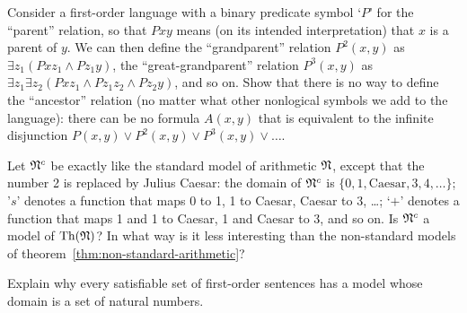 \begin{exercise}
  Consider a first-order language with a binary predicate symbol `$P$' for the ``parent'' relation,
  so that $Pxy$ means (on its intended interpretation) that $x$ is a parent of $y$.
  We can then define the ``grandparent'' relation $P^2(x,y)$ as $\exists z_1 (Pxz_1 \land Pz_1y)$,
  the ``great-grandparent'' relation $P^3(x,y)$ as $\exists z_1 \exists z_2 (Pxz_1 \land Pz_1z_2 \land Pz_2y)$,
  and so on.
  Show that there is no way to define the ``ancestor'' relation
  (no matter what other nonlogical symbols we add to the language):
  there can be no formula $A(x,y)$ that is equivalent to the infinite disjunction
  $P(x,y) \lor P^2(x,y) \lor P^3(x,y) \lor \ldots$.
\end{exercise}

\begin{exercise}
  Let $\mathfrak{N}^{c}$ be exactly like the standard model of arithmetic $\mathfrak{N}$,
  except that the number 2 is replaced by Julius Caesar:
  the domain of $\mathfrak{N}^c$ is $\{ 0, 1, \text{Caesar}, 3, 4, \ldots \}$;
  '$s$' denotes a function that maps 0 to 1, 1 to Caesar, Caesar to 3, \ldots;
  `$+$' denotes a function that maps 1 and 1 to Caesar, 1 and Caesar to 3,
  and so on.
  Is $\mathfrak{N}^{c}$ a model of $\mathrm{Th}(\mathfrak{N})$?
  In what way is it less interesting than the non-standard models of theorem~\ref{thm:non-standard-arithmetic}?
\end{exercise}

\begin{exercise}
  Explain why every satisfiable set of first-order sentences has a model whose
  domain is a set of natural numbers.
\end{exercise}


